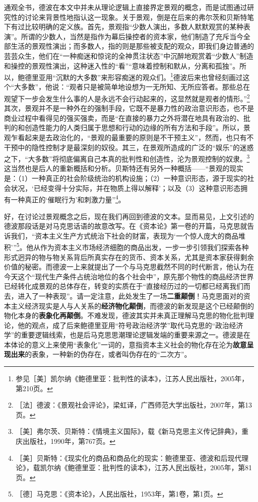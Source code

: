 \documentclass[fontset=fandol, a4paper, 12pt, openright]{ctexbook}
\begin{document}
通观全书，德波在本文中并未从理论逻辑上直接界定景观的概念，而是试图通过研究性的讨论来背景性地指认这一现象。关于景观，倒是在后来的弗尔茨和贝斯特笔下有过比较明确的定义族。首先，景观指“少数人演出，多数人默默观赏的某种表演”。所谓的少数人，当然是指作为幕后操控者的资本家，他们制造了充斥当今全部生活的景观性演出；而多数人，指的则是那些被支配的观众，即我们身边普通的芸芸众生，他们在“一种痴迷和惊诧的全神贯注状态”中沉醉地观赏着“少数人”制造和操控的景观性演出，这种迷入性的“看”“意味着控制和默从，分离和孤独”。所以，鲍德里亚用“沉默的大多数”来形容痴迷的观众们。\footnote{参见［美］凯尔纳《鲍德里亚：批判性的读本》，江苏人民出版社，2005年，第210页。}德波后来也曾经刻画过这个“大多数”，他说：“观者只是被简单地设想为一无所知、无所应答者。那些总在观望下一步会发生什么事的人是永远不会行动起来的，这显然就是观者的情形。”\footnote{［法］德波：《景观社会评论》，梁虹译，广西师范大学出版社，2007年，第13页。}其次，景观并不是一种外在的强制手段，它既不是暴力性的政治意识形态，也不是商业过程中看得见的强买强卖，而是“在直接的暴力之外将潜在地具有政治的、批判的和创造性能力的人类归属于思想和行动的边缘的所有方法和手段”。所以，景观乍看起来是去政治化的，“景观的最重要的原则是不干预主义”，然而，也只有不干预中的隐性控制才是最深刻的奴役。其三，在景观所造成的广泛的“娱乐”的迷惑之下，“大多数”将彻底偏离自己本真的批判性和创造性，沦为景观控制的奴隶。\footnote{［美］弗尔茨、贝斯特：《情境主义国际》，载《新马克思主义传记辞典》，重庆出版社，1990年，第767页。}这当然也是后人的重新概括和分析。贝斯特还有另外一种概括——“景观的现实是：（1）一种真正的社会阶级统治的机构设施；（2）一种意识形态，源于现实的社会状况，‘已经变得十分实际，并在物质上得以解释’；以及（3）这种意识形态拥有一种真正的‘催眠行为’和刺激力量”\footnote{［美］贝斯特：《现实化的商品和商品化的现实：鲍德里亚、德波和后现代理论》，载凯尔纳《鲍德里亚：批判性的读本》，江苏人民出版社，2005年，第81页。}。

好，在讨论过景观概念之后，现在我们再回到德波的文本。显而易见，上文引述的德波那段话是对马克思话语的故意改写。在《资本论》第一卷的开篇，马克思就告诉我们，“资本主义生产方式统治下社会的财富，表现为‘一个惊人庞大的商品堆积’”\footnote{［德］马克思：《资本论》，人民出版社，1953年，第1卷，第1页。}。他从作为资本主义市场经济细胞的商品出发，一步一步引领我们探索各种形式迥异的物与物关系背后所真实存在的货币、资本关系，尤其是资本家获得剩余价值的秘密。而德波一上来就提出了一个与马克思截然不同的时代断言，他认为在今天这个“现代生产条件占统治地位的各个社会中”，原先那个物性的商品经济世界已经转化成景观的总体存在，转变的实质在于“直接经历过的一切都已经离我们而去，进入了一种表现”。请一定注意，此处发生了一场\textbf{二重颠倒}！马克思面对的资本主义经济现实是人与人关系的\textbf{经济物化颠倒}，而德波的新发现是这个已经颠倒的物化本身的\textbf{表象化再颠倒}。不难发现，德波其实并未真正理解马克思的物化批判理论，他的观点，成了后来鲍德里亚用“符号政治经济学”取代马克思的“政治经济学”的重要逻辑线索，也是后马克思思潮理论逻辑发端的重要来源之一。德波是在本体论的意义上来使用“表象化”一词的，意指资本主义社会的物化存在沦为\textbf{故意呈现出来}的表象，一种新的伪存在，或者叫伪存在的“二次方”。
\end{document}
